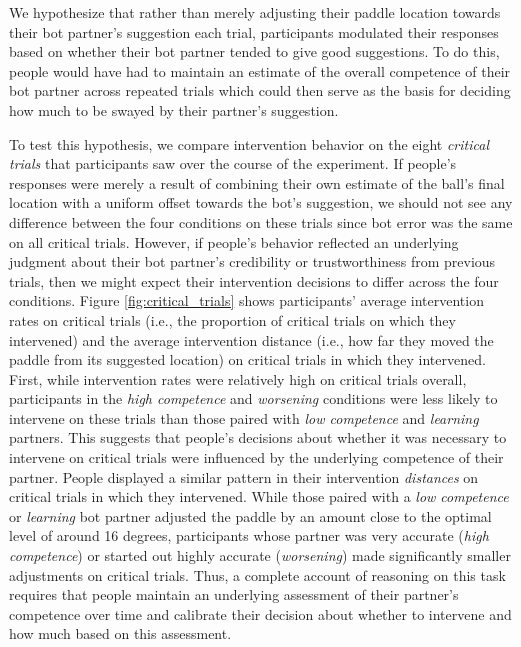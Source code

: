 \documentclass[10pt,letterpaper]{article}
\begin{document}
We hypothesize that rather than merely adjusting their paddle location towards their bot partner's suggestion each trial, participants modulated their responses based on whether their bot partner tended to give good suggestions. To do this, people would have had to maintain an estimate of the overall competence of their bot partner across repeated trials which could then serve as the basis for deciding how much to be swayed by their partner's suggestion. 

To test this hypothesis, we compare intervention behavior on the eight \textit{critical trials} that participants saw over the course of the experiment. If people's responses were merely a result of combining their own estimate of the ball's final location with a uniform offset towards the bot's suggestion, we should not see any difference between the four conditions on these trials since bot error was the same on all critical trials. However, if people's behavior reflected an underlying judgment about their bot partner's credibility or trustworthiness from previous trials, then we might expect their intervention decisions to differ across the four conditions. Figure \ref{fig:critical_trials} shows participants' average intervention rates on critical trials (i.e., the proportion of critical trials on which they intervened) and the average intervention distance (i.e., how far they moved the paddle from its suggested location) on critical trials in which they intervened. First, while intervention rates were relatively high on critical trials overall, participants in the \textit{high competence} and \textit{worsening} conditions were less likely to intervene on these trials than those paired with \textit{low competence} and \textit{learning} partners. This suggests that people's decisions about whether it was necessary to intervene on critical trials were influenced by the underlying competence of their partner. People displayed a similar pattern in their intervention \textit{distances} on critical trials in which they intervened. While those paired with a \textit{low competence} or \textit{learning} bot partner adjusted the paddle by an amount close to the optimal level of around 16 degrees, participants whose partner was very accurate (\textit{high competence}) or started out highly accurate (\textit{worsening}) made significantly smaller adjustments on critical trials. Thus, a complete account of  reasoning on this task requires that people maintain an underlying assessment of their partner's competence over time and calibrate their decision about whether to intervene and how much based on this assessment.
\end{document}
